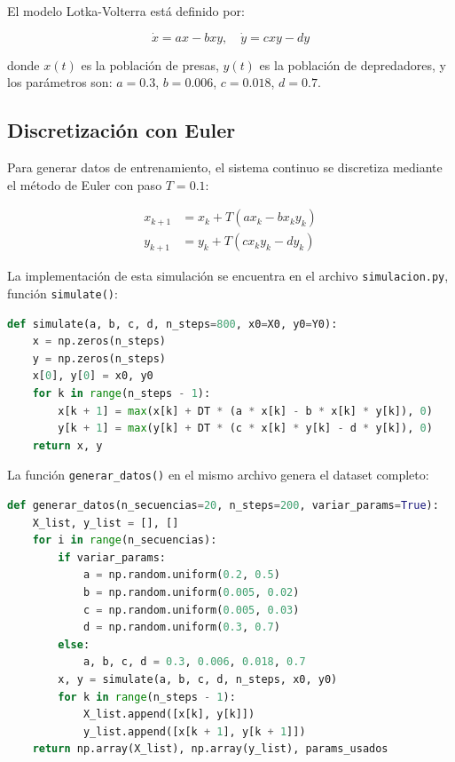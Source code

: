 \documentclass[10pt,twocolumn]{article}
\begin{document}
El modelo Lotka-Volterra está definido por:

\begin{equation}
\dot{x} = ax - bxy, \quad \dot{y} = cxy - dy
\end{equation}

donde $x(t)$ es la población de presas, $y(t)$ es la población de depredadores, y los parámetros son: $a=0.3$, $b=0.006$, $c=0.018$, $d=0.7$.

\subsection{Discretización con Euler}

Para generar datos de entrenamiento, el sistema continuo se discretiza mediante el método de Euler con paso $T = 0.1$:

\begin{align*}
x_{k+1} &= x_k + T(a x_k - b x_k y_k)\\
y_{k+1} &= y_k + T(c x_k y_k - d y_k)
\end{align*}

La implementación de esta simulación se encuentra en el archivo \texttt{simulacion.py}, función \texttt{simulate()}:

\begin{lstlisting}[language=Python]
def simulate(a, b, c, d, n_steps=800, x0=X0, y0=Y0):
    x = np.zeros(n_steps)
    y = np.zeros(n_steps)
    x[0], y[0] = x0, y0
    for k in range(n_steps - 1):
        x[k + 1] = max(x[k] + DT * (a * x[k] - b * x[k] * y[k]), 0)
        y[k + 1] = max(y[k] + DT * (c * x[k] * y[k] - d * y[k]), 0)
    return x, y
\end{lstlisting}

La función \texttt{generar\_datos()} en el mismo archivo genera el dataset completo:

\begin{lstlisting}[language=Python]
def generar_datos(n_secuencias=20, n_steps=200, variar_params=True):
    X_list, y_list = [], []
    for i in range(n_secuencias):
        if variar_params:
            a = np.random.uniform(0.2, 0.5)
            b = np.random.uniform(0.005, 0.02)
            c = np.random.uniform(0.005, 0.03)
            d = np.random.uniform(0.3, 0.7)
        else:
            a, b, c, d = 0.3, 0.006, 0.018, 0.7
        x, y = simulate(a, b, c, d, n_steps, x0, y0)
        for k in range(n_steps - 1):
            X_list.append([x[k], y[k]])
            y_list.append([x[k + 1], y[k + 1]])
    return np.array(X_list), np.array(y_list), params_usados
\end{lstlisting}
\end{document}
